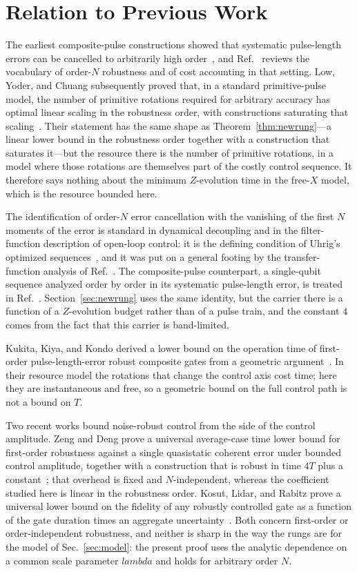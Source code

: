 \documentclass[%
  aps,
  pra,
  preprint,
  superscriptaddress,
  amsmath,amssymb,
  nofootinbib,
  floatfix,
]{revtex4-2}
\def\lambda{lambda}\def\tau{tau}\def\phi{phi}\def\alpha{alpha}%
\theoremstyle{definition}
\theoremstyle{remark}
\begin{document}
\section{Relation to Previous Work}
\label{sec:related}

The earliest composite-pulse constructions showed that systematic pulse-length errors can be
cancelled to arbitrarily high order~\cite{Brown2004}, and Ref.~\cite{Merrill2014} reviews the
vocabulary of order-$N$ robustness and of cost accounting in that setting. Low, Yoder, and
Chuang subsequently proved that, in a standard primitive-pulse model, the number of primitive
rotations required for arbitrary accuracy has optimal linear scaling in the robustness order,
with constructions saturating that scaling~\cite{Low2014}. Their statement has the same shape
as Theorem~\ref{thm:newrung}---a linear lower bound in the robustness order together with a
construction that saturates it---but the resource there is the number of primitive rotations,
in a model where those rotations are themselves part of the costly control sequence. It
therefore says nothing about the minimum $Z$-evolution time in the free-$X$ model, which is the
resource bounded here.

The identification of order-$N$ error cancellation with the vanishing of the first $N$ moments
of the error is standard in dynamical decoupling and in the filter-function description of
open-loop control: it is the defining condition of Uhrig's optimized
sequences~\cite{Uhrig2007}, and it was put on a general footing by the transfer-function
analysis of Ref.~\cite{PazSilva2014}. The composite-pulse counterpart, a single-qubit sequence
analyzed order by order in its systematic pulse-length error, is treated
in Ref.~\cite{Kabytayev2014}. Section~\ref{sec:newrung} uses the same identity, but the carrier
there is a function of a $Z$-evolution budget rather than of a pulse train, and the constant $4$
comes from the fact that this carrier is band-limited.

Kukita, Kiya, and Kondo derived a lower bound on the operation time of first-order
pulse-length-error robust composite gates from a geometric argument~\cite{Kukita2023}. In their
resource model the rotations that change the control axis cost time; here they are instantaneous
and free, so a geometric bound on the full control path is not a bound on $T$.

Two recent works bound noise-robust control from the side of the control amplitude. Zeng and
Deng prove a universal average-case time lower bound for first-order robustness against a
single quasistatic coherent error under bounded control amplitude, together with a construction
that is robust in time $4T$ plus a constant~\cite{Zeng2025}; that overhead is fixed and
$N$-independent, whereas the coefficient studied here is linear in the robustness order. Kosut,
Lidar, and Rabitz prove a universal lower bound on the fidelity of any robustly controlled gate
as a function of the gate duration times an aggregate uncertainty~\cite{Kosut2025}. Both
concern first-order or order-independent robustness, and neither is sharp in the way the rungs
are for the model of Sec.~\ref{sec:model}: the present proof uses the analytic dependence on a
common scale parameter $\lambda$ and holds for arbitrary order $N$.
\end{document}

